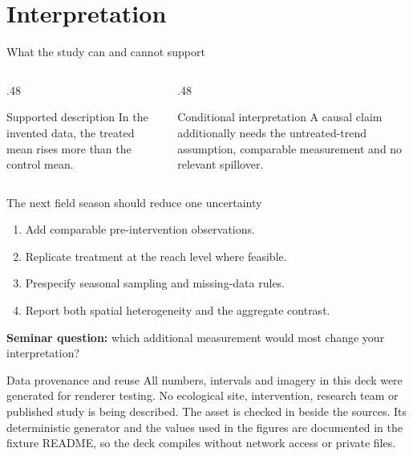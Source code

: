 \documentclass[11pt,aspectratio=169]{beamer}
\begin{document}
\section{Interpretation}
\begin{frame}{What the study can and cannot support}
\begin{columns}[T]
\begin{column}{.48\textwidth}\begin{exampleblock}{Supported description}
In the invented data, the treated mean rises more than the control mean.
\end{exampleblock}\end{column}
\begin{column}{.48\textwidth}\begin{alertblock}{Conditional interpretation}
A causal claim additionally needs the untreated-trend assumption, comparable measurement and no relevant spillover.
\end{alertblock}\end{column}
\end{columns}
\end{frame}
\begin{frame}{The next field season should reduce one uncertainty}
\begin{enumerate}
\item Add comparable pre-intervention observations.
\item Replicate treatment at the reach level where feasible.
\item Prespecify seasonal sampling and missing-data rules.
\item Report both spatial heterogeneity and the aggregate contrast.
\end{enumerate}
\bigskip
\textbf{Seminar question:} which additional measurement would most change your interpretation?
\end{frame}
\appendix
\begin{frame}{Data provenance and reuse}
\small
All numbers, intervals and imagery in this deck were generated for renderer testing. No ecological site, intervention, research team or published study is being described.
\medskip
The asset is checked in beside the sources. Its deterministic generator and the values used in the figures are documented in the fixture README, so the deck compiles without network access or private files.
\end{frame}
\end{document}
